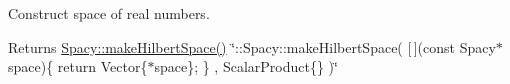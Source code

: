 Construct space of real numbers. 

\begin{DoxyReturn}{Returns}
\hyperlink{group__SpacyGroup_ga63c49d211bf214be1fb321440ed03aad_ga63c49d211bf214be1fb321440ed03aad}{Spacy\+::make\+Hilbert\+Space()} \char`\"{}\+::\+Spacy\+::make\+Hilbert\+Space( \mbox{[}$\,$\mbox{]}(const Spacy$\ast$ space)\{ return Vector\{$\ast$space\}; \} , Scalar\+Product\{\} )\char`\"{} 
\end{DoxyReturn}
